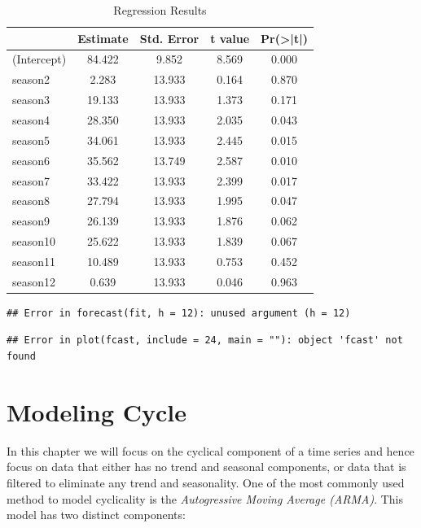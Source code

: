 \documentclass[]{book}
\theoremstyle{definition}
\theoremstyle{definition}
\theoremstyle{definition}
\theoremstyle{remark}
\begin{document}
\begin{table}

\caption{\label{tab:ch5-table3}Regression Results}
\centering
\begin{tabular}[t]{lcccc}
\toprule
  & Estimate & Std. Error & t value & Pr(>|t|)\\
\midrule
(Intercept) & 84.422 & 9.852 & 8.569 & 0.000\\
season2 & 2.283 & 13.933 & 0.164 & 0.870\\
season3 & 19.133 & 13.933 & 1.373 & 0.171\\
season4 & 28.350 & 13.933 & 2.035 & 0.043\\
season5 & 34.061 & 13.933 & 2.445 & 0.015\\
\addlinespace
season6 & 35.562 & 13.749 & 2.587 & 0.010\\
season7 & 33.422 & 13.933 & 2.399 & 0.017\\
season8 & 27.794 & 13.933 & 1.995 & 0.047\\
season9 & 26.139 & 13.933 & 1.876 & 0.062\\
season10 & 25.622 & 13.933 & 1.839 & 0.067\\
\addlinespace
season11 & 10.489 & 13.933 & 0.753 & 0.452\\
season12 & 0.639 & 13.933 & 0.046 & 0.963\\
\bottomrule
\end{tabular}
\end{table}

\begin{verbatim}
## Error in forecast(fit, h = 12): unused argument (h = 12)
\end{verbatim}

\begin{verbatim}
## Error in plot(fcast, include = 24, main = ""): object 'fcast' not found
\end{verbatim}

\hypertarget{modeling-cycle}{%
\chapter{Modeling Cycle}\label{modeling-cycle}}

In this chapter we will focus on the cyclical component of a time series
and hence focus on data that either has no trend and seasonal
components, or data that is filtered to eliminate any trend and
seasonality. One of the most commonly used method to model cyclicality
is the \emph{Autogressive Moving Average (ARMA)}. This model has two
distinct components:
\end{document}
